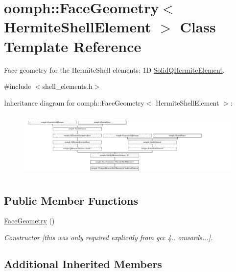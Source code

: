 \hypertarget{classoomph_1_1FaceGeometry_3_01HermiteShellElement_01_4}{}\section{oomph\+:\+:Face\+Geometry$<$ Hermite\+Shell\+Element $>$ Class Template Reference}
\label{classoomph_1_1FaceGeometry_3_01HermiteShellElement_01_4}


Face geometry for the Hermite\+Shell elements\+: 1D \hyperlink{classoomph_1_1SolidQHermiteElement}{Solid\+Q\+Hermite\+Element}.  




{\ttfamily \#include $<$shell\+\_\+elements.\+h$>$}

Inheritance diagram for oomph\+:\+:Face\+Geometry$<$ Hermite\+Shell\+Element $>$\+:\begin{figure}[H]
\begin{center}
\leavevmode
\includegraphics[height=3.343284cm]{classoomph_1_1FaceGeometry_3_01HermiteShellElement_01_4}
\end{center}
\end{figure}
\subsection*{Public Member Functions}
\begin{DoxyCompactItemize}
\item 
\hyperlink{classoomph_1_1FaceGeometry_3_01HermiteShellElement_01_4_a0ec8a60363ca4b27ab57f6ae6847046c}{Face\+Geometry} ()
\begin{DoxyCompactList}\small\item\em Constructor \mbox{[}this was only required explicitly from gcc 4.. onwards...\mbox{]}. \end{DoxyCompactList}\end{DoxyCompactItemize}
\subsection*{Additional Inherited Members}


